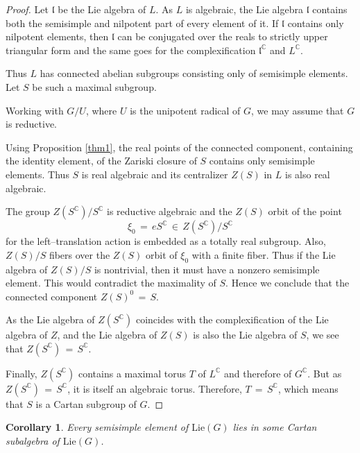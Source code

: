 \documentclass[12pt]{amsart}
\newtheorem{corollary}[theorem]{Corollary}
\begin{document}
\begin{proof}
Let $\mathfrak{l}$ be the Lie algebra of $L$. As $L$ is algebraic, the Lie
algebra $\mathfrak{l}$ contains both the semisimple and nilpotent part of
every element of it. If $\mathfrak{l}$ contains only nilpotent elements,
then $\mathfrak{l}$ can be conjugated over the reals to strictly upper
triangular form and the same goes for the complexification
${\mathfrak{l}}^{\mathbb{C}}$ and $L^{\mathbb{C}}$.

Thus $L$ has connected abelian subgroups consisting only of semisimple
elements. Let $S$ be such a maximal subgroup.

Working with $G/U$, where $U$ is the unipotent radical of $G$, we may assume
that $G$ is reductive.

Using Proposition \ref{thm1}, the real points of the connected component,
containing the identity element, of the Zariski closure of $S$ contains only
semisimple elements. Thus $S$ is real algebraic and its centralizer $Z(S)$
in $L$ is also real algebraic.

The group $Z(S^{\mathbb{C}})/S^{\mathbb{C}}$ is reductive algebraic and the
$Z(S)$ orbit of the point
\begin{equation*}
\xi_0\,=\, e S^{\mathbb{C}}\,\in\, Z(S^{\mathbb{C}})/S^{\mathbb{C}}
\end{equation*}
for the left--translation action is embedded as a totally real subgroup.
Also, $Z(S)/S$ fibers over the $Z(S)$ orbit of $\xi_0$ with a finite fiber.
Thus if the Lie algebra of $Z(S)/S$ is nontrivial, then it must have a
nonzero semisimple element. This would contradict the maximality of $S$.
Hence we conclude that the connected component $Z(S)^0\,=\, S$.

As the Lie algebra of $Z(S^{\mathbb{C}})$ coincides with the
complexification of the Lie algebra of $Z$, and the Lie algebra of $Z(S)$ is
also the Lie algebra of $S$, we see that $Z(S^{\mathbb{C}})\,=\, S^{\mathbb{C}}$.

Finally, $Z(S^{\mathbb{C}})$ contains a maximal torus $T$ of $L^{\mathbb{C}}$
and therefore of $G^{\mathbb{C}}$. But as $Z(S^{\mathbb{C}})\,=\, S^{\mathbb{C}}$, it
is itself an algebraic torus. Therefore, $T\,=\, S^{\mathbb{C}}$,
which means that $S$ is a Cartan subgroup of $G$.
\end{proof}

\begin{corollary}
\label{cor4} Every semisimple element of $\mathrm{Lie}(G)$ lies in some
Cartan subalgebra of $\mathrm{Lie}(G)$.
\end{corollary}
\end{document}
